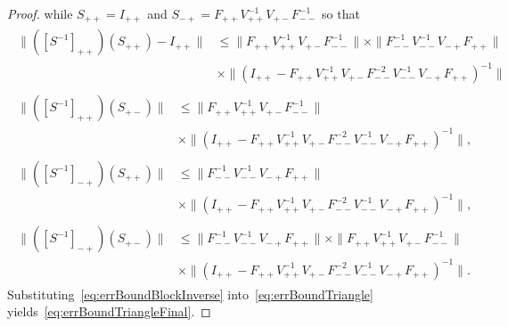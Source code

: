 \begin{proof}
    while $S_{++}=I_{++}$ and $S_{-+}=F_{++}V_{++}^{-1}V_{+-}F_{--}^{-1}$ so
    that
    \begin{subequations}
    \begin{align}
    \begin{split}
        \|([S^{-1}]_{++})(S_{++})- I_{++}\|
        &\leq
        \|F_{++}V_{++}^{-1}V_{+-}F_{--}^{-1}\|\times
        \|F_{--}^{-1}V_{--}^{-1}V_{-+}F_{++}\|\\
        &\times
        \|(I_{++}-F_{++}V_{++}^{-1}V_{+-}F_{--}^{-2}V_{--}^{-1}
        V_{-+}F_{++})^{-1}\|
    \end{split}\\
    \begin{split}
        \|([S^{-1}]_{++})(S_{+-})\|
        &\leq
        \|F_{++}V_{++}^{-1}V_{+-}F_{--}^{-1}\|\\
        &\times
        \|(I_{++}-F_{++}V_{++}^{-1}V_{+-}F_{--}^{-2}V_{--}^{-1}V_{-+}
        F_{++})^{-1}\|,
    \end{split}\\
    \begin{split}
        \|([S^{-1}]_{-+})(S_{++})\|
        &\leq\|F_{--}^{-1}V_{--}^{-1}V_{-+}F_{++}\|\\
        &\times\|(I_{++}-F_{++}V_{++}^{-1}V_{+-}F_{--}^{-2}V_{--}^{-1}V_{-+}
        F_{++})^{-1}\|,
    \end{split}\\
    \begin{split}
        \|([S^{-1}]_{-+})(S_{+-})\|
        &\leq\|F_{--}^{-1}V_{--}^{-1}V_{-+}F_{++}\|
        \times\|F_{++}V_{++}^{-1}V_{+-}F_{--}^{-1}\|\\
        &\times\|(I_{++}-F_{++}V_{++}^{-1}V_{+-}F_{--}^{-2}V_{--}^{-1}V_{-+}
        F_{++})^{-1}\|.
    \end{split}
    \end{align}
    \label{eq:errBoundBlockInverse}
    \end{subequations}
    Substituting~\eqref{eq:errBoundBlockInverse}
    into~\eqref{eq:errBoundTriangle} yields~\eqref{eq:errBoundTriangleFinal}.
\end{proof}


